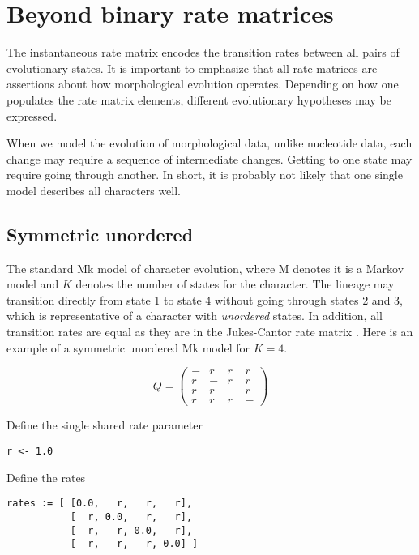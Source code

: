\section{Beyond binary rate matrices} \label{sec:dm_matrix}

The instantaneous rate matrix encodes the transition rates between all pairs of evolutionary states.
It is important to emphasize that all rate matrices are assertions about how morphological evolution operates.
Depending on how one populates the rate matrix elements, different evolutionary hypotheses may be expressed. \par

When we model the evolution of morphological data, unlike nucleotide data, each change may require a sequence of intermediate changes.
Getting to one state may require going through another.
In short, it is probably not likely that one single model describes all characters well. \par 


\subsection{Symmetric unordered}

The standard Mk model of character evolution, where M denotes it is a Markov model and $K$ denotes the number of states for the character.
The lineage may transition directly from state 1 to state 4 without going through states 2 and 3, which is representative of a character with {\it unordered} states.
In addition, all transition rates are equal as they are in the Jukes-Cantor rate matrix \citep{Jukes1969}.
Here is an example of a symmetric unordered Mk model for $K=4$.

\begin{equation*}
Q = \begin{pmatrix}
- & r & r & r \\
r & - & r & r \\
r & r & - & r \\
r & r & r & - 
\end{pmatrix}
\end{equation*}


Define the single shared rate parameter
{\tt \begin{snugshade*}
\begin{lstlisting}
r <- 1.0
\end{lstlisting}
\end{snugshade*}}

Define the rates
{\tt \begin{snugshade*}
\begin{lstlisting}
rates := [ [0.0,   r,   r,   r],
           [  r, 0.0,   r,   r],
           [  r,   r, 0.0,   r],
           [  r,   r,   r, 0.0] ]
\end{lstlisting}
\end{snugshade*}}

